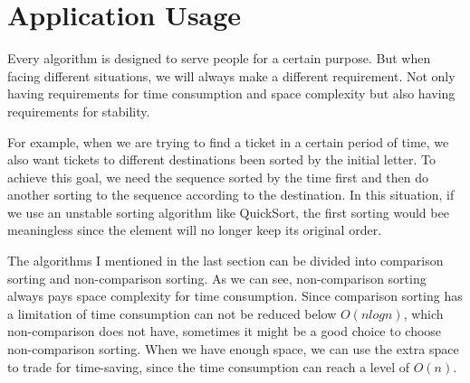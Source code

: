 \documentclass[12pt]{article}
\begin{document}
\section{Application Usage}
Every algorithm is designed to serve people for a certain purpose. But when facing different situations, we will always make a different requirement. Not only having requirements for time consumption and space complexity but also having requirements for stability. 

For example, when we are trying to find a ticket in a certain period of time, we also want tickets to different destinations been sorted by the initial letter. To achieve this goal, we need the sequence sorted by the time first and then do another sorting to the sequence according to the destination. In this situation, if we use an unstable sorting algorithm like QuickSort, the first sorting would bee meaningless since the element will no longer keep its original order.

The algorithms I mentioned in the last section can be divided into comparison sorting and non-comparison sorting. As we can see, non-comparison sorting always pays space complexity for time consumption. Since comparison sorting has a limitation of time consumption can not be reduced below $O(nlogn)$, which non-comparison does not have, sometimes it might be a good choice to choose non-comparison sorting. When we have enough space, we can use the extra space to trade for time-saving, since the time consumption can reach a level of $O(n)$.
\end{document}
